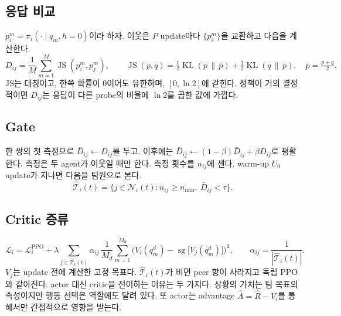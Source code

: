 \documentclass[11pt]{article}
\newcommand{\JS}{\operatorname{JS}}
\newcommand{\KL}{\operatorname{KL}}
\newcommand{\sg}{\operatorname{sg}}
\begin{document}
\subsection{응답 비교}
$p_i^m = \pi_i(\cdot \mid q_m, h = 0)$이라 하자. 이웃은 $P$ update마다 $\{p_i^m\}$을 교환하고 다음을 계산한다.
\[
  D_{ij} = \frac{1}{M}\sum_{m=1}^{M} \JS(p_i^m, p_j^m), \qquad
  \JS(p,q) = \tfrac12 \KL(p \,\|\, \bar p) + \tfrac12 \KL(q \,\|\, \bar p), \quad \bar p = \tfrac{p+q}{2}.
\]
JS는 대칭이고, 한쪽 확률이 0이어도 유한하며, $[0, \ln 2]$에 갇힌다. 정책이 거의 결정적이면 $D_{ij}$는 응답이 다른 probe의 비율에 $\ln 2$를 곱한 값에 가깝다.

\subsection{Gate}
한 쌍의 첫 측정으로 $\bar D_{ij} \leftarrow D_{ij}$를 두고, 이후에는 $\bar D_{ij} \leftarrow (1-\beta)\bar D_{ij} + \beta D_{ij}$로 평활한다.
측정은 두 agent가 이웃일 때만 한다. 측정 횟수를 $n_{ij}$에 센다. warm-up $U_0$ update가 지나면 다음을 팀원으로 본다.
\[
  \hat{\mathcal{T}}_i(t) = \{ j \in \mathcal{N}_i(t) : n_{ij} \ge n_{\min},\ \bar D_{ij} < \tau \}.
\]

\subsection{Critic 증류}
\[
  \mathcal{L}_i = \mathcal{L}^{\mathrm{PPO}}_i + \lambda \sum_{j \in \hat{\mathcal{T}}_i(t)} \alpha_{ij}\,
  \frac{1}{M_d}\sum_{m=1}^{M_d} \Big( V_i(q^d_m) - \sg\big[V_j(q^d_m)\big] \Big)^2, \qquad \alpha_{ij} = \frac{1}{|\hat{\mathcal{T}}_i(t)|}.
\]
$V_j$는 update 전에 계산한 고정 목표다. $\hat{\mathcal{T}}_i(t)$가 비면 peer 항이 사라지고 독립 PPO와 같아진다.
actor 대신 critic을 전이하는 이유는 두 가지다. 상황의 가치는 팀 목표의 속성이지만 행동 선택은 역할에도 달려 있다. 또 actor는 advantage $\hat A = \hat R - V_i$를 통해서만 간접적으로 영향을 받는다.
\end{document}
